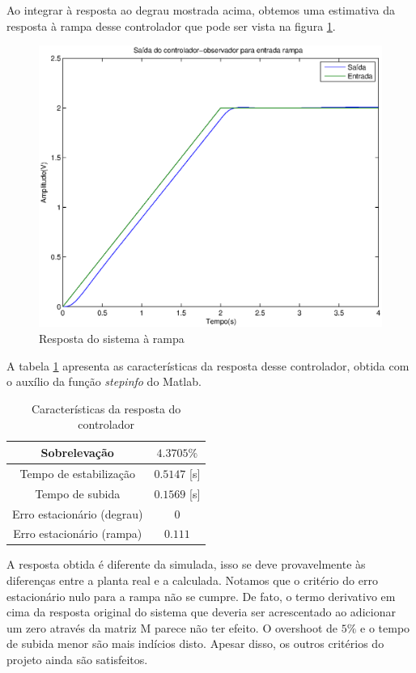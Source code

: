 \documentclass{article}
\begin{document}
Ao integrar à resposta ao degrau mostrada acima, obtemos uma estimativa da resposta à rampa desse controlador que pode ser vista na figura \ref{fig:yrSISR}.
\begin{figure}[H]
	\centering
	\includegraphics[width=0.8\linewidth]{../yrSISR}
	\caption{Resposta do sistema à rampa}
	\label{fig:yrSISR}
\end{figure}

A tabela \ref{tab:stepinfoSIS} apresenta as características da resposta desse controlador, obtida com o auxílio da função \textit{stepinfo} do Matlab.
\begin{table}[H]
	\centering
	\caption{Características da resposta do controlador}
	\label{tab:stepinfoSIS}
	\begin{tabular}{|c|c|}
		\hline Sobrelevação 				& $4.3705\%$ \\ 
		\hline Tempo de estabilização 		& $0.5147$ [s]\\ 
		\hline Tempo de subida				& $0.1569$ [s]\\ 
		\hline Erro estacionário (degrau) 	& $0$\\ 
		\hline Erro estacionário (rampa) 	& $0.111$\\ 
		\hline 
	\end{tabular} 
\end{table}
A resposta obtida é diferente da simulada, isso se deve provavelmente às diferenças entre a planta real e a calculada. Notamos que o critério do erro estacionário nulo para a rampa não se cumpre. De fato, o termo derivativo em cima da resposta original do sistema que deveria ser acrescentado ao adicionar um zero através da matriz M parece não ter efeito. O overshoot de $5\%$ e o tempo de subida menor são mais indícios disto.
Apesar disso, os outros critérios do projeto ainda são satisfeitos.
\end{document}
